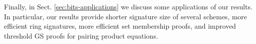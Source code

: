 Finally, in Sect. \ref{sec:bits-applications} we discuss some applications of our results.  
In particular, our results provide shorter %
signature size of several schemes,
  more efficient ring signatures,
  more efficient set membership proofs,
  and improved threshold GS proofs for pairing product equations.



